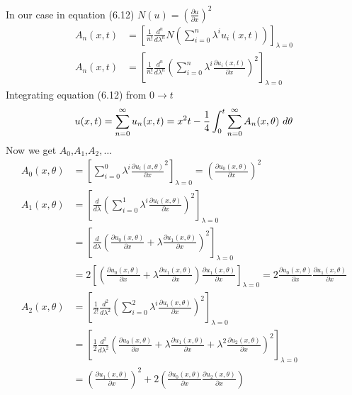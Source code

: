 \begin{example}
    In our case in equation (6.12) $\displaystyle N(u) = \left(\frac{\partial u}{\partial x}\right)^2$
    \begin{align*}
        A_n(x,t) & = \left[\frac{1}{n!} \frac{d^n}{d \lambda^n} N\left(\sum_{i=0}^{n}  \lambda^i u_i(x,t)\right)\right]_{\lambda = 0}
        \\
        A_n(x,t) & = \left[\frac{1}{n!} \frac{d^n}{d \lambda^n} \left(\sum_{i=0}^{n}  \lambda^i \frac{\partial u_i(x,t)}{\partial x}\right)^2\right]_{\lambda = 0}
    \end{align*}
    Integrating equation (6.12) from $0 \to t$
    \[
        u(x,t) = \sum_{n=0}^{\infty} u_n(x,t)  = x^2t - \frac{1}{4} \int_{0}^{t}\sum_{n=0}^{\infty} A_n(x,\theta) \,\, d\theta
    \]
    Now we get $A_0$,$A_1$,$A_2,\dots$
    \begin{align*}
        A_0(x,\theta) & = \left[\sum_{i=0}^{0}  \lambda^i \frac{\partial u_i(x,\theta)}{\partial x}^2\right]_{\lambda = 0} = \left(\frac{\partial u_0(x,\theta)}{\partial x}\right)^2
        \\
        A_1(x,\theta) & = \left[\frac{d}{d \lambda} \left(\sum_{i=0}^{1}  \lambda^i \frac{\partial u_i(x,\theta)}{\partial x}\right)^2\right]_{\lambda = 0}
        \\
                      & = \left[\frac{d}{d \lambda} \left(\frac{\partial u_0(x,\theta)}{\partial x} + \lambda \frac{\partial u_1(x,\theta)}{\partial x}\right)^2\right]_{\lambda = 0}
        \\
                      & =2\left[\left(\frac{\partial u_0(x,\theta)}{\partial x} + \lambda \frac{\partial u_1(x,\theta)}{\partial x}\right)\frac{\partial u_1(x,\theta)}{\partial x}\right]_{\lambda = 0} = 2\frac{\partial u_0(x,\theta)}{\partial x} \frac{\partial u_1(x,\theta)}{\partial x}
        \\
        A_2(x,\theta) & =\left[\frac{1}{2!} \frac{d^2}{d \lambda^2} \left(\sum_{i=0}^{2}  \lambda^i \frac{\partial u_i(x,\theta)}{\partial x}\right)^2\right]_{\lambda = 0}
        \\
                      & = \left[\frac{1}{2} \frac{d^2}{d \lambda^2} \left(\frac{\partial u_0(x,\theta)}{\partial x} + \lambda \frac{\partial u_1(x,\theta)}{\partial x} + \lambda^2 \frac{\partial u_2(x,\theta)}{\partial x}\right)^2\right]_{\lambda = 0}
        \\
                      & = \left(\frac{\partial u_1(x,\theta)}{\partial x}\right)^2 + 2 \left(\frac{\partial u_0(x,\theta)}{\partial x}\frac{\partial u_2(x,\theta)}{\partial x}\right)
        \\

\end{align*}
\end{example}
